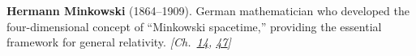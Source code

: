 \textbf{Hermann Minkowski} (1864–1909). German mathematician who developed the four-dimensional concept of ``Minkowski spacetime,'' providing the essential framework for general relativity. \emph{[Ch.~\hyperref[ch:compacttwinparadox]{14}, \hyperref[ch:observervac]{47}]}

